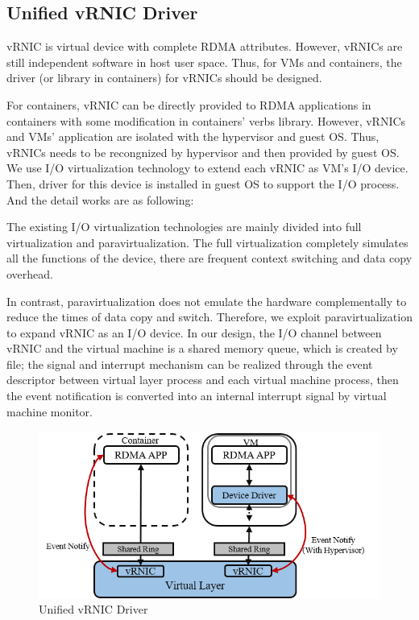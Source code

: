 \subsection{Unified vRNIC Driver}

vRNIC is virtual device with complete RDMA attributes. However, vRNICs are still independent software in host user space. Thus, for VMs and containers, the driver (or library in containers) for vRNICs should be designed.

For containers, vRNIC can be directly provided to RDMA applications in containers with some modification in containers' verbs library. However, vRNICs  and VMs' application are isolated with the hypervisor and guest OS. Thus, vRNICs needs to be recongnized by hypervisor and then provided by guest OS. We use I/O virtualization technology to extend each vRNIC as VM's I/O device. Then, driver for this device is installed in guest OS to support the I/O process. And the detail works are as following:

The existing I/O virtualization technologies are mainly divided into full virtualization and paravirtualization. The full virtualization completely simulates all the functions of the device, there are frequent context switching and data copy overhead. 

In contrast, paravirtualization does not emulate the hardware complementally to reduce the times of data copy and switch. Therefore, we exploit paravirtualization to expand vRNIC as an I/O device. In our design, the I/O channel between vRNIC and the virtual machine is a shared memory queue, which is created by file; the signal and interrupt mechanism can be realized through the event descriptor between virtual layer process and each virtual machine process, then the event notification is converted into an internal interrupt signal by virtual machine monitor.
	
	\begin{figure}[!ht]
		\centering
		\includegraphics[width=1.0\linewidth]{images/interface-general}
		\caption{Unified vRNIC Driver}
		\label{fig:vrnic-driver}
	\end{figure}
	
